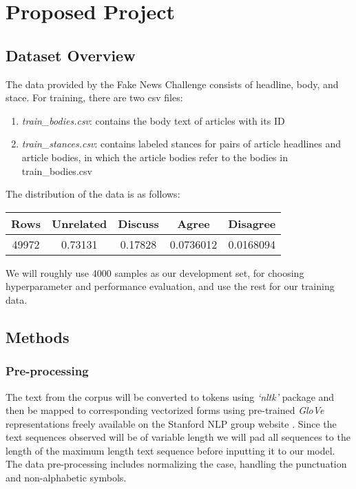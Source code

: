\documentclass[12pt]{article}
\begin{document}
\section{Proposed Project}
\subsection{Dataset Overview}

The data provided by the Fake News Challenge consists of 
headline, body, and stace. 
For training, there are two csv files:
\begin{enumerate}
  \item \textit{train\_bodies.csv}: contains the body text of articles with its ID
  \item \textit{train\_stances.csv}: contains labeled stances for pairs of article 
      headlines and article bodies, in which the article bodies refer to the 
      bodies in train\_bodies.csv
\end{enumerate}

The distribution of the data is as follows:
\begin{center}
  \begin{tabular} 
    {|c|c|c|c|c|}
    \hline
    Rows & Unrelated & Discuss & Agree & Disagree \\
    \hline
    49972 & 0.73131 & 0.17828 & 0.0736012 & 0.0168094 \\
    \hline
  \end{tabular}
\end{center}
We will roughly use 4000 samples as our development set, for choosing 
hyperparameter and performance evaluation, and use the rest for 
our training data. 

\subsection{Methods}
\subsubsection{Pre-processing}

The text from the corpus will be converted to tokens using \textit{‘nltk’} package and 
then be mapped to corresponding vectorized forms using  pre-trained \textit{GloVe} 
representations freely available on the Stanford NLP group website \cite{Bird:2009:NLP:1717171,pennington2014glove}. 
Since the text sequences observed will be of variable length we will pad all 
sequences to the length of the maximum length text sequence before inputting 
it to our model. The data pre-processing includes normalizing the case, handling the punctuation
and non-alphabetic symbols.
\end{document}
